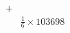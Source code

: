 \documentclass[preview]{standalone}
\begin{document}
\begin{align*}
+&\\&\frac{1}{6}\times103698
\end{align*}
\end{document}
